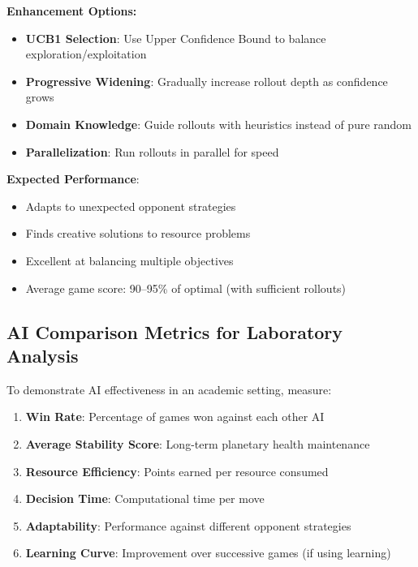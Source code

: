 \documentclass[12pt,a4paper]{article}
\begin{document}
\textbf{Enhancement Options:}
\begin{itemize}
    \item \textbf{UCB1 Selection}: Use Upper Confidence Bound to balance exploration/exploitation
    \item \textbf{Progressive Widening}: Gradually increase rollout depth as confidence grows
    \item \textbf{Domain Knowledge}: Guide rollouts with heuristics instead of pure random
    \item \textbf{Parallelization}: Run rollouts in parallel for speed
\end{itemize}

\textbf{Expected Performance}:
\begin{itemize}
    \item Adapts to unexpected opponent strategies
    \item Finds creative solutions to resource problems
    \item Excellent at balancing multiple objectives
    \item Average game score: 90--95\% of optimal (with sufficient rollouts)
\end{itemize}

\subsection{AI Comparison Metrics for Laboratory Analysis}

To demonstrate AI effectiveness in an academic setting, measure:

\begin{enumerate}
    \item \textbf{Win Rate}: Percentage of games won against each other AI
    \item \textbf{Average Stability Score}: Long-term planetary health maintenance
    \item \textbf{Resource Efficiency}: Points earned per resource consumed
    \item \textbf{Decision Time}: Computational time per move
    \item \textbf{Adaptability}: Performance against different opponent strategies
    \item \textbf{Learning Curve}: Improvement over successive games (if using learning)
\end{enumerate}

\end{document}
